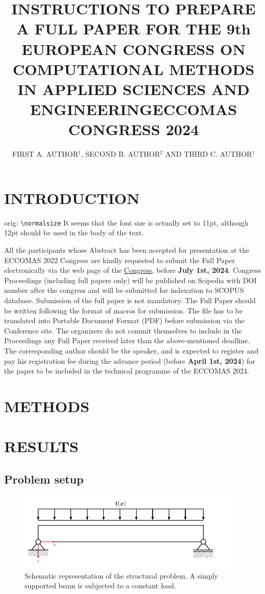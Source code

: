 \documentclass[a4paper]{eccomas_paper-2024}
\title{INSTRUCTIONS TO PREPARE A FULL PAPER FOR THE 9th EUROPEAN CONGRESS ON COMPUTATIONAL METHODS IN APPLIED SCIENCES AND ENGINEERING\break ECCOMAS CONGRESS 2024}
\author{FIRST A. AUTHOR$^1$, SECOND B. AUTHOR$^2$ AND THIRD C. AUTHOR$^1$}
\begin{document}
\thispagestyle{empty}

\section{INTRODUCTION}

\makeatletter
orig: \f@size
\verb+\normalsize+ \normalsize \f@size
\makeatother
It seems that the font size is actually set to 11pt, although 12pt should be used in the body of the text.

All the participants whose Abstract has been accepted for presentation at the ECCOMAS 2022 Congress are kindly requested to submit the Full Paper electronically via the web page of the \href{https://eccomas2024.org/lisbon}{Congress}, before \textbf{July 1st, 2024}. Congress Proceedings (including full papers only) will be published on Scipedia with DOI number after the congress and will be submitted for indexation to SCOPUS database. Submission of the full paper is not mandatory. The Full Paper should be written following the format of macros for submission. The file has to be translated into Portable Document Format (PDF) before submission via the Conference site. The organizers do not commit themselves to include in the Proceedings any Full Paper received later than the above-mentioned deadline. The corresponding author should be the speaker, and is expected to register and pay his registration fee during the advance period (before \textbf{April 1st, 2024}) for the paper to be included in the technical programme of the ECCOMAS 2024.

\section{METHODS}

\section{RESULTS}

\subsection{Problem setup}

\begin{figure}
    \begin{center}
        \includegraphics[width=0.95\textwidth]{./figures/beam/beam_sketch.pdf}
    \end{center}
    \caption{Schematic representation of the structural problem. A simply supported beam is subjected to a constant load.}\label{fig:beam_sketch}
\end{figure}
\end{document}
